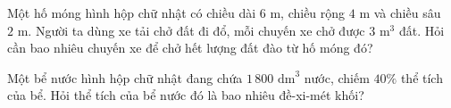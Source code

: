\begin{ex} %
Một hố móng hình hộp chữ nhật có chiều dài $6\text{ m}$, chiều rộng $4\text{ m}$ và chiều sâu $2\text{ m}$. Người ta dùng xe tải chở đất đi đổ, mỗi chuyến xe chở được $3\text{ m}^3$ đất. Hỏi cần bao nhiêu chuyến xe để chở hết lượng đất đào từ hố móng đó?
\end{ex}

\begin{ex} %
Một bể nước hình hộp chữ nhật đang chứa $1\,800\text{ dm}^3$ nước, chiếm $40\%$ thể tích của bể. Hỏi thể tích của bể nước đó là bao nhiêu đề-xi-mét khối?
\end{ex}
